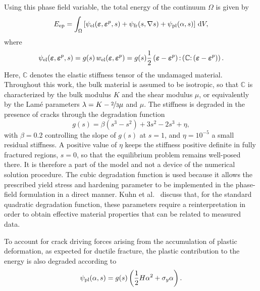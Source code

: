 \documentclass[pdflatex,sn-mathphys-num]{sn-jnl}%
\theoremstyle{thmstyleone}%
\theoremstyle{thmstyletwo}%
\theoremstyle{thmstylethree}%
\begin{document}
Using this phase field variable, the total energy of the continuum $\Omega$ is given by
\begin{equation}
    E_{\rm{ep}} = \int_{\Omega} \left[ 
    \psi_{\rm{el}}(\boldsymbol{\varepsilon},\boldsymbol{\varepsilon}^p,s) 
    + \psi_{\rm{fr}}(s,\nabla{s}) 
    + \psi_{\rm{pl}}(\alpha,s)
    \right] \, \mathrm{d}V,
    \label{eq:E_ep_total}
\end{equation}
where
\begin{equation}
    \psi_{\rm{el}}(\boldsymbol{\varepsilon},\boldsymbol{\varepsilon}^p,s)
    = g(s)\,w_{\rm{el}}(\boldsymbol{\varepsilon},\boldsymbol{\varepsilon}^p)
    = g(s)\dfrac{1}{2}
    \left(\boldsymbol{\varepsilon}-\boldsymbol{\varepsilon}^p\right)
    {:}
    \left(\boldsymbol{\mathbb{C}}{:}
    \left(\boldsymbol{\varepsilon}-\boldsymbol{\varepsilon}^p\right)\right).
    \label{eq:psi_el}
\end{equation}
Here, $\boldsymbol{\mathbb{C}}$ denotes the elastic stiffness tensor of the undamaged material. Throughout this work, the bulk material is assumed to be isotropic, so that $\boldsymbol{\mathbb{C}}$ is characterized by the bulk modulus $K$ and the shear modulus $\mu$, or equivalently by the Lam\'e parameters $\lambda = K - \nicefrac{2}{3}\mu$ and $\mu$. The stiffness is degraded in the presence of cracks through the degradation function
\begin{equation}
    g(s) = \beta\left(s^3 - s^2\right) + 3s^2 - 2s^3 + \eta,
    \label{eq:deg_grad}
\end{equation}
with $\beta = 0.2$ controlling the slope of $g(s)$ at $s=1$, and $\eta = 10^{-5}$ a small residual stiffness. A positive value of $\eta$ keeps the stiffness positive definite in fully fractured regions, $s = 0$, so that the equilibrium problem remains well-posed there. It is therefore a part of the model and not a device of the numerical solution procedure.
The cubic degradation function is used because it allows the prescribed yield stress and hardening parameter to be implemented in the phase-field formulation in a direct manner.
Kuhn et al.~\cite{kuhn_phase_2016} discuss that, for the standard quadratic degradation function, these parameters require a reinterpretation in order to obtain effective material properties that can be related to measured data.

To account for crack driving forces arising from the accumulation of plastic deformation, as expected for ductile fracture, the plastic contribution to the energy is also degraded according to
\begin{equation}
    \psi_{\rm{pl}}(\alpha,s) = g(s)\left(\dfrac{1}{2}H\alpha^2 + \sigma_y\alpha\right).
    \label{eq:psi_pl}
\end{equation}
\end{document}
